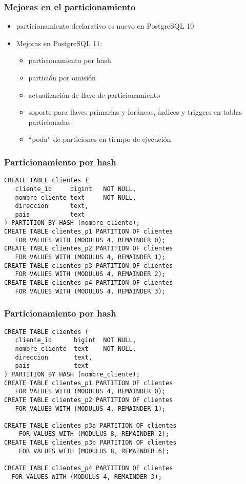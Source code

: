 \begin{frame}
\frametitle{Mejoras en el particionamiento}

\begin{itemize}
\item particionamiento declarativo es nuevo en PostgreSQL 10
\item Mejoras en PostgreSQL 11:

\begin{itemize}
\item particionamiento por hash
\item partición por omisión
\item actualización de llave de particionamiento
\item soporte para llaves primarias y foráneas, índices y triggers en tablas particionadas
\item ``poda'' de particiones en tiempo de ejecución
\end{itemize}
\end{itemize}
\end{frame}

\begin{frame}[fragile]
\frametitle{Particionamiento por hash}

\footnotesize
\begin{lstlisting}
CREATE TABLE clientes (
   cliente_id     bigint   NOT NULL,
   nombre_cliente text     NOT NULL,
   direccion      text,
   pais           text
) PARTITION BY HASH (nombre_cliente);
CREATE TABLE clientes_p1 PARTITION OF clientes
   FOR VALUES WITH (MODULUS 4, REMAINDER 0);
CREATE TABLE clientes_p2 PARTITION OF clientes
   FOR VALUES WITH (MODULUS 4, REMAINDER 1);
CREATE TABLE clientes_p3 PARTITION OF clientes
   FOR VALUES WITH (MODULUS 4, REMAINDER 2);
CREATE TABLE clientes_p4 PARTITION OF clientes
   FOR VALUES WITH (MODULUS 4, REMAINDER 3);
\end{lstlisting}
\end{frame}

\begin{frame}[fragile]
\frametitle{Particionamiento por hash}

\footnotesize
\begin{lstlisting}
CREATE TABLE clientes (
   cliente_id      bigint  NOT NULL,
   nombre_cliente  text    NOT NULL,
   direccion       text,
   pais            text
) PARTITION BY HASH (nombre_cliente);
CREATE TABLE clientes_p1 PARTITION OF clientes
   FOR VALUES WITH (MODULUS 4, REMAINDER 0);
CREATE TABLE clientes_p2 PARTITION OF clientes
   FOR VALUES WITH (MODULUS 4, REMAINDER 1);

CREATE TABLE clientes_p3a PARTITION OF clientes
    FOR VALUES WITH (MODULUS 8, REMAINDER 2);
CREATE TABLE clientes_p3b PARTITION OF clientes
    FOR VALUES WITH (MODULUS 8, REMAINDER 6);

CREATE TABLE clientes_p4 PARTITION OF clientes
  FOR VALUES WITH (MODULUS 4, REMAINDER 3);
\end{lstlisting}
\end{frame}

